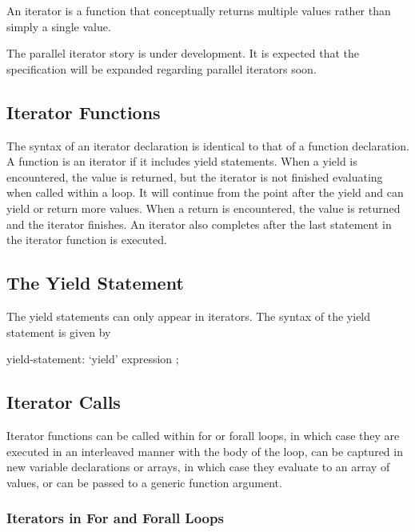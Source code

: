 \label{Iterators}

An iterator is a function that conceptually returns multiple values
rather than simply a single value.

\begin{openissue}
The parallel iterator story is under development.  It is expected that
the specification will be expanded regarding parallel iterators soon.
\end{openissue}

\subsection{Iterator Functions}
\label{Iterator_Functions}

The syntax of an iterator declaration is identical to that of a
function declaration.  A function is an iterator if it includes yield
statements.  When a yield is encountered, the value is returned, but
the iterator is not finished evaluating when called within a loop.  It
will continue from the point after the yield and can yield or return
more values.  When a return is encountered, the value is returned and
the iterator finishes.  An iterator also completes after the last
statement in the iterator function is executed.

\subsection{The Yield Statement}
\label{The_Yield_Statement}

The yield statements can only appear in iterators.  The syntax of the
yield statement is given by
\begin{syntax}
yield-statement:
  `yield' expression ;
\end{syntax}

\subsection{Iterator Calls}
\label{Iterator_Calls}

Iterator functions can be called within for or forall loops, in which
case they are executed in an interleaved manner with the body of the
loop, can be captured in new variable declarations or arrays, in which
case they evaluate to an array of values, or can be passed to a
generic function argument.

\subsubsection{Iterators in For and Forall Loops}
\label{Iterators_in_For_and_Forall_Loops}

